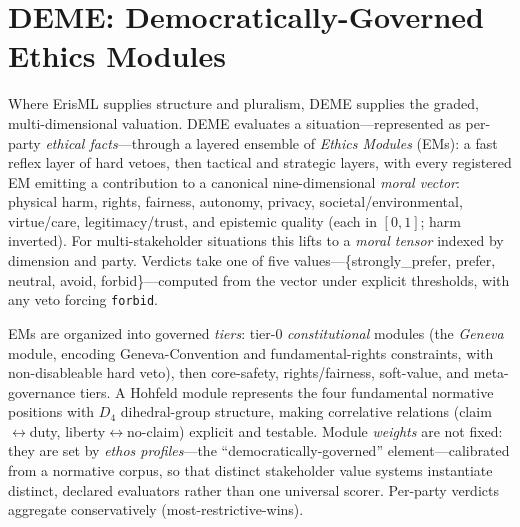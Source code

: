 \section{DEME: Democratically-Governed Ethics Modules}
\label{sec:deme}

Where ErisML supplies structure and pluralism, DEME supplies the graded, multi-dimensional
valuation. DEME evaluates a situation---represented as per-party \emph{ethical
facts}---through a layered ensemble of \emph{Ethics Modules} (EMs): a fast reflex layer of
hard vetoes, then tactical and strategic layers, with every registered EM emitting a
contribution to a canonical nine-dimensional \emph{moral vector}: physical harm, rights,
fairness, autonomy, privacy, societal/environmental, virtue/care, legitimacy/trust, and
epistemic quality (each in $[0,1]$; harm inverted). For multi-stakeholder situations this
lifts to a \emph{moral tensor} indexed by dimension and party. Verdicts take one of five
values---\{strongly\_prefer, prefer, neutral, avoid, forbid\}---computed from the vector
under explicit thresholds, with any veto forcing \texttt{forbid}.

EMs are organized into governed \emph{tiers}: tier-0 \emph{constitutional} modules (the
\emph{Geneva} module, encoding Geneva-Convention and fundamental-rights constraints, with
non-disableable hard veto), then core-safety, rights/fairness, soft-value, and
meta-governance tiers. A Hohfeld module represents the four fundamental normative positions
with $D_4$ dihedral-group structure, making correlative relations (claim$\leftrightarrow$duty,
liberty$\leftrightarrow$no-claim) explicit and testable. Module \emph{weights} are not fixed:
they are set by \emph{ethos profiles}---the ``democratically-governed'' element---calibrated
from a normative corpus, so that distinct stakeholder value systems instantiate distinct,
declared evaluators rather than one universal scorer. Per-party verdicts aggregate
conservatively (most-restrictive-wins).

